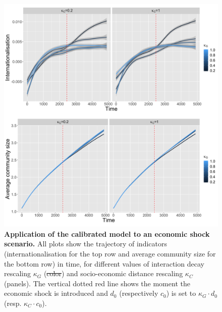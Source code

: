 \documentclass[10pt,letterpaper]{article}
\providecommand{\DIFadd}[1]{{\protect\color{blue}\uwave{#1}}} %
\providecommand{\DIFdel}[1]{{\protect\color{red}\sout{#1}}}                      %
\providecommand{\DIFdelend}{} %
\providecommand{\DIFaddFL}[1]{\DIFadd{#1}} %
\providecommand{\DIFdelFL}[1]{\DIFdel{#1}} %
\providecommand{\DIFaddbeginFL}{} %
\providecommand{\DIFaddendFL}{} %
\providecommand{\DIFdelbeginFL}{} %
\providecommand{\DIFdelendFL}{} %
\begin{document}
\DIFdelend %
\begin{figure}
    \DIFdelbeginFL %
\DIFdelendFL \DIFaddbeginFL \begin{center}
    \includegraphics[width=\linewidth]{figures/Fig9.png}
    \end{center}
	\DIFaddendFL \caption{\textbf{Application of the calibrated model to an economic shock scenario.} All plots show the trajectory of indicators (internationalisation for the top row and average community size for the bottom row) in time, for different values of interaction decay rescaling $\kappa_G$ (\DIFdelbeginFL \DIFdelFL{color}\DIFdelendFL \DIFaddbeginFL \DIFaddFL{colour}\DIFaddendFL ) and socio-economic distance rescaling $\kappa_C$ (panels). The vertical dotted red line shows the moment the economic shock is introduced and $d_0$ (respectively $c_0$) is set to $\kappa_G \cdot d_0$ (resp. $\kappa_C \cdot c_0$).\label{fig:fig9}}
\end{figure}
\end{document}
